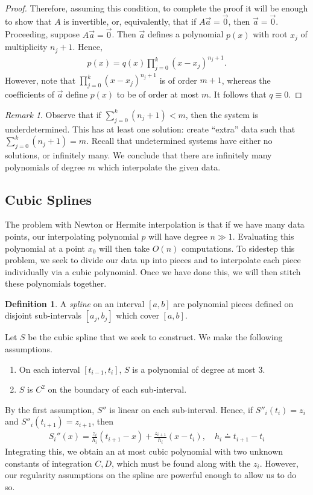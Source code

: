 \documentclass[12pt]{article}
\theoremstyle{plain}
\theoremstyle{definition}
\newtheorem*{definition}{Definition}
\theoremstyle{remark}
\newtheorem*{remark}{Remark}
\numberwithin{equation}{section}  %
\begin{document}
\begin{proof}
			Therefore, assuming this condition, to complete
			the proof it will be enough to show that $A$ is invertible, or, equivalently,
			that if $A \vec{a}=\vec{0}$, then $\vec{a} = \vec{0}$. Proceeding, suppose
			$A \vec{a}=\vec{0}$. Then $\vec{a}$ defines a polynomial $p(x)$ with root $x_j$ of
			multiplicity $n_j +1$. Hence,
			\begin{equation*}
				\begin{split}
					p(x) = q(x) \prod_{j=0}^{k}(x-x_{j})^{n_{j}+1}.
				\end{split}
			\end{equation*}
			However, note that $\prod_{j=0}^{k}(x-x_{j})^{n_{j}+1}$ is of order $m+1$,
			whereas the coefficients of $\vec{a}$ define $p(x)$ to be of order at most $m$.
			It follows that $q \equiv 0$. 
		\end{proof}
		\begin{remark}
			Observe that if $\sum_{j=0}^{k}(n_j + 1) < m$, then the system is underdetermined.
			This has at least one solution: create
			``extra'' data such that $\sum_{j=0}^k (n_j + 1) = m$. Recall that
			undetermined systems have either no solutions, or infinitely many. 
			We conclude that there are infinitely many polynomials of degree $m$ which
			interpolate the given data.
		\end{remark}
		\subsection{Cubic Splines}
		The problem with Newton or Hermite interpolation is that if we have
		many data points, our interpolating polynomial $p$ will have degree $n \gg 1$.
		Evaluating this polynomial at a point $x_0$ will then take $O(n)$ computations.
		To sidestep this problem, we seek to divide our data up into pieces
		and to interpolate each piece individually via a cubic polynomial.
		Once we have done this, we will then stitch these polynomials together.
		\begin{definition}
			A \emph{spline} on an interval $[a,b]$ are polynomial pieces defined on 
			disjoint sub-intervals $[a_j,b_j]$ which cover $[a,b]$. 
		\end{definition}
		Let $S$ be the cubic spline that we seek to construct. We make
		the following assumptions.
		\begin{enumerate}
			\item On each interval $[t_{i-1}, t_i]$, $S$ is a polynomial of degree
				at most $3$.
			\item $S$ is $C^2$ on the boundary of each sub-interval.
		\end{enumerate}
		By the first assumption, $S''$ is linear on each sub-interval.
		Hence, if $S''_i(t_i) = z_i$ and $S''_{i}(t_{i+1}) = z_{i+1}$,
		then
		\begin{align*}
			S_{i}''(x) = \frac{z_i}{h_i}(t_{i+1} - x) + \frac{z_{i+1}}{h_i}(x- t_i),
			\quad h_i \doteq
			t_{i+1}- t_i	
		\end{align*}
		Integrating this, we obtain an at most cubic polynomial with  two unknown
		constants of integration $C, D$, which must be found along with the $z_i$.
		However, our regularity assumptions on the spline are powerful enough to allow
		us to do so.
\end{document}
